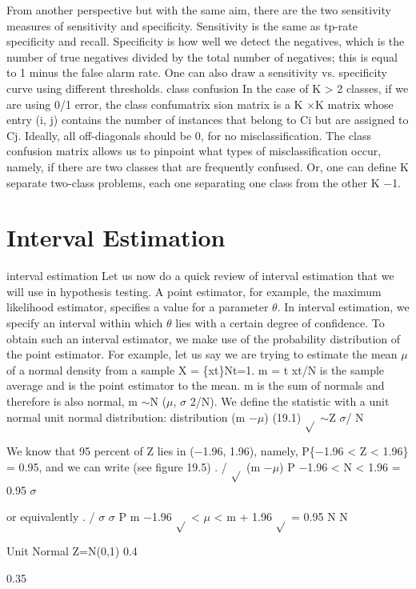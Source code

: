 From another perspective but with the same aim, there are the two sensitivity measures of sensitivity and specificity. Sensitivity is the same as tp-rate specificity and recall. Specificity is how well we detect the negatives, which is the number of true negatives divided by the total number of negatives; this is equal to 1 minus the false alarm rate. One can also draw a sensitivity vs. specificity curve using different thresholds. class confusion In the case of K > 2 classes, if we are using 0/1 error, the class confumatrix sion matrix is a K $\times$K matrix whose entry (i, j) contains the number of instances that belong to Ci but are assigned to Cj. Ideally, all off-diagonals should be 0, for no misclassification. The class confusion matrix allows us to pinpoint what types of misclassification occur, namely, if there are two classes that are frequently confused. Or, one can define K separate two-class problems, each one separating one class from the other K $-$1.

\section{Interval Estimation}

interval estimation Let us now do a quick review of interval estimation that we will use in hypothesis testing. A point estimator, for example, the maximum likelihood estimator, specifies a value for a parameter $\theta$. In interval estimation, we specify an interval within which $\theta$ lies with a certain degree of confidence. To obtain such an interval estimator, we make use of the probability distribution of the point estimator. For example, let us say we are trying to estimate the mean $\mu$ of a normal density from a sample X = \{xt\}Nt=1. m = t xt/N is the sample average and is the point estimator to the mean. m is the sum of normals and therefore is also normal, m $\sim$N ($\mu$, $\sigma$ 2/N). We define the statistic with a unit normal unit normal distribution: distribution (m $-$$\mu$) (19.1) $\sqrt{}$ $\sim$Z $\sigma$/ N

We know that 95 percent of Z lies in ($-$1.96, 1.96), namely, P\{$-$1.96 < Z < 1.96\} = 0.95, and we can write (see figure 19.5) . / $\sqrt{}$ (m $-$$\mu$) P $-$1.96 < N < 1.96 = 0.95 $\sigma$

or equivalently . / $\sigma$ $\sigma$ P m $-$1.96 $\sqrt{}$ < $\mu$ < m + 1.96 $\sqrt{}$ = 0.95 N N

Unit Normal Z=N(0,1) 0.4

0.35

